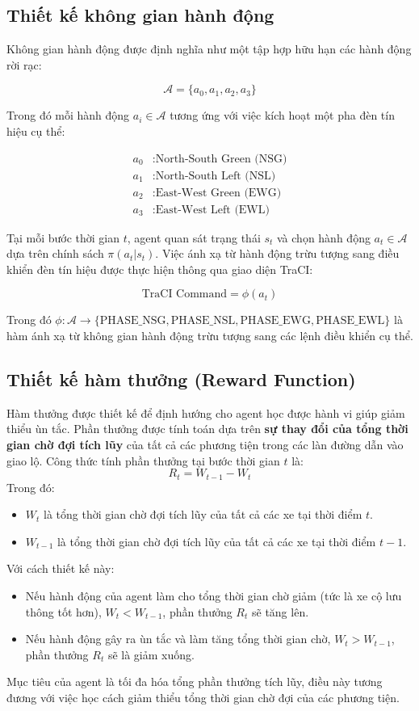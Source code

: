 \subsection{Thiết kế không gian hành động}
Không gian hành động được định nghĩa như một tập hợp hữu hạn các hành động rời rạc:

\[
    \mathcal{A} = \{a_0, a_1, a_2, a_3\}
\]

Trong đó mỗi hành động $a_i \in \mathcal{A}$ tương ứng với việc kích hoạt một pha đèn tín hiệu cụ thể:

\begin{align}
    a_0 &: \text{North-South Green (NSG)} \\
    a_1 &: \text{North-South Left (NSL)} \\
    a_2 &: \text{East-West Green (EWG)} \\
    a_3 &: \text{East-West Left (EWL)}
\end{align}

Tại mỗi bước thời gian $t$, agent quan sát trạng thái $s_t$ và chọn hành động $a_t \in \mathcal{A}$ dựa trên chính sách $\pi(a_t|s_t)$. Việc ánh xạ từ hành động trừu tượng sang điều khiển đèn tín hiệu được thực hiện thông qua giao diện TraCI:

\[
    \text{TraCI Command} = \phi(a_t)
\]

Trong đó $\phi: \mathcal{A} \rightarrow \{\text{PHASE\_NSG}, \text{PHASE\_NSL}, \text{PHASE\_EWG}, \text{PHASE\_EWL}\}$ là hàm ánh xạ từ không gian hành động trừu tượng sang các lệnh điều khiển cụ thể.

\subsection{Thiết kế hàm thưởng (Reward Function)}
Hàm thưởng được thiết kế để định hướng cho agent học được hành vi giúp giảm thiểu ùn tắc. Phần thưởng được tính toán dựa trên \textbf{sự thay đổi của tổng thời gian chờ đợi tích lũy} của tất cả các phương tiện trong các làn đường dẫn vào giao lộ. Công thức tính phần thưởng tại bước thời gian $t$ là:
\[
    R_{t} = W_{t-1}- W_{t}
\]
Trong đó:
\begin{itemize}
    \item $W_{t}$ là tổng thời gian chờ đợi tích lũy của tất cả các xe tại thời điểm
        $t$.

    \item $W_{t-1}$ là tổng thời gian chờ đợi tích lũy của tất cả các xe tại thời
        điểm $t-1$.
\end{itemize}
Với cách thiết kế này:
\begin{itemize}
    \item Nếu hành động của agent làm cho tổng thời gian chờ giảm (tức là xe cộ
        lưu thông tốt hơn), $W_{t} < W_{t-1}$, phần thưởng $R_{t}$ sẽ tăng lên.

    \item Nếu hành động gây ra ùn tắc và làm tăng tổng thời gian chờ,
        $W_{t} > W_{t-1}$, phần thưởng $R_{t}$ sẽ là giảm xuống.
\end{itemize}
Mục tiêu của agent là tối đa hóa tổng phần thưởng tích lũy, điều này tương đương với việc học cách giảm thiểu tổng thời gian chờ đợi của các phương tiện.

